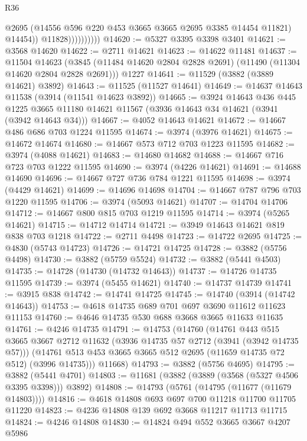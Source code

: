 \begin{lexlean}{R36}
\begin{coremodule}
                            @2695
                            (@14556 @596 @220 @453 @3665 @3665 @2695 @3385 @14454 @11821)
                            @14454))
                        @11828))))))))))
@14620 := @5327 @3395 @3398 @3401
@14621 := @3568 @14620
@14622 := @2711 @14621
@14623 := @14622 @11481
@14637 := @11504
    @14623
    (@3845 (@11484 @14620 @2804 @2828 @2691) (@11490 (@11304 @14620 @2804 @2828 @2691)))
    @1227
@14641 := @11529 (@3882 (@3889 @14621) @3892)
@14643 := @11525 (@11527 @14641)
@14649 := @14637 @14643 @11538 (@3914 (@11541 @14623 @3892))
@14665 := @3924
    @14643
    @436
    @445
    @1225
    @3665
    @11180
    @14621
    @11567
    (@3936 @14643 @34 @14621 (@3941 (@3942 @14643 @34)))
@14667 := @4052 @14643 @14621
@14672 := @14667 @486 @686 @703 @1224 @11595
@14674 := @3974 (@3976 @14621)
@14675 := @14672 @14674
@14680 := @14667 @573 @712 @703 @1223 @11595
@14682 := @3974 (@4088 @14621)
@14683 := @14680 @14682
@14688 := @14667 @716 @723 @703 @1222 @11595
@14690 := @3974 (@4226 @14621)
@14691 := @14688 @14690
@14696 := @14667 @727 @736 @784 @1221 @11595
@14698 := @3974 (@4429 @14621)
@14699 := @14696 @14698
@14704 := @14667 @787 @796 @703 @1220 @11595
@14706 := @3974 (@5093 @14621)
@14707 := @14704 @14706
@14712 := @14667 @800 @815 @703 @1219 @11595
@14714 := @3974 (@5265 @14621)
@14715 := @14712 @14714
@14721 := @3949 @14643 @14621 @819 @838 @703 @1218
@14722 := @2711 @4498
@14723 := @14722 @2695
@14725 := @4830 (@5743 @14723)
@14726 := @14721 @14725
@14728 := @3882 (@5756 @4498)
@14730 := @3882 (@5759 @5524)
@14732 := @3882 (@5441 @4503)
@14735 := @14728 (@14730 (@14732 @14643))
@14737 := @14726 @14735 @11595
@14739 := @3974 (@5455 @14621)
@14740 := @14737 @14739
@14741 := @3915 @838
@14742 := @14741 @14725
@14745 := @14740 (@3914 (@14742 @14643))
@14753 := @4618 @14735 @689 @701 @697 @3690 @11612 @11623 @11153
@14760 := @4646 @14735 @530 @688 @3668 @3665 @11633 @11635
@14761 := @4246 @14735
@14791 := @14753
    (@14760
      (@14761
        @443
        @515
        @3665
        @3667
        @2712
        @11632
        (@3936 @14735 @57 @2712 (@3941 (@3942 @14735 @57)))
        (@14761 @513 @453 @3665 @3665 @512 @2695 (@11659 @14735 @72 @512) (@3996 @14735)))
      @11668)
@14793 := @3882 (@5756 @4695)
@14795 := @3882 (@5441 @4701)
@14803 := @11681 (@3882 (@3889 (@3568 (@5327 @4506 @3395 @3398))) @3892)
@14808 := @14793 (@5761 (@14795 (@11677 (@11679 @14803))))
@14816 := @4618 @14808 @693 @697 @700 @11218 @11700 @11705 @11220
@14823 := @4236 @14808 @139 @692 @3668 @11217 @11713 @11715
@14824 := @4246 @14808
@14830 := @14824 @494 @552 @3665 @3667 @4207 @5986

\end{coremodule}
\end{lexlean}
